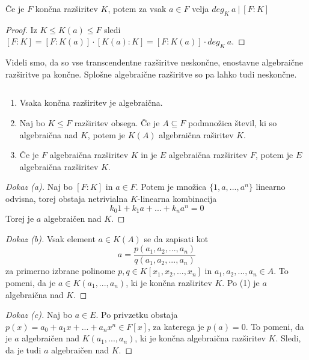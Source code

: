 \documentclass[11pt, a4paper]{article}
\begin{document}
    \begin{corollary}
        Če je \(F\) končna razširitev \(K\), potem za vsak \(a \in F\) velja \(deg_{K}\ a\ |\ [F:K]\)
    \end{corollary}

    \begin{proof}
        Iz \(K \le K(a) \le F\) sledi \([F:K] = [F:K(a)] \cdot [K(a):K] = [F:K(a)] \cdot deg_{K}\ a\).
    \end{proof}


    Videli smo, da so vse transcendentne razširitve neskončne, enostavne algebraične razširitve pa končne. Splošne algebraične razširitve so pa lahko tudi neskončne.

    \begin{theorem}
        \(\)\par
        \begin{enumerate}[label=\alph*)]
            \item Vsaka končna razširitev je algebraična.
            \item Naj bo \(K \le F\) razširitev obsega. Če je \(A \subseteq F\) podmnožica števil, ki so algebraična nad \(K\), potem je \(K(A)\) algebraična raširitev \(K\).
            \item Če je \(F\) algebraična razširitev \(K\) in je \(E\) algebraična razširitev \(F\), potem je \(E\) algebraična razširitev \(K\).
        \end{enumerate}
    \end{theorem}

    \begin{proof}[Dokaz \emph{(a)}]
        Naj bo \([F:K]\) in \(a \in F\). Potem je množica \(\{1,a,...,a^{n}\}\) linearno odvisna, torej obstaja netrivialna \(K\)-linearna kombinacija 
        \[k_0 1 + k_1 a + ... + k_n a^{n} = 0\]
        Torej je \(a\) algebraičen nad \(K\).
    \end{proof}

    \begin{proof}[Dokaz \emph{(b)}]
        Vsak element \(a \in K(A)\) se da zapisati kot 
        \[a = \frac{p(a_1,a_2,...,a_n)}{q(a_1,a_2,...,a_n)}\]
        za primerno izbrane polinome \(p,q \in K[x_1,x_2,...,x_n]\) in \(a_1,a_2,...,a_n \in A\). To pomeni, da je \(a \in K(a_1,...,a_n)\), ki je končna razširitev \(K\). Po (1) je \(a\) algebraična nad \(K\).
    \end{proof}

    \begin{proof}[Dokaz \emph{(c)}]
        Naj bo \(a \in E\). Po privzetku obstaja \(p(x)=a_0 + a_1 x + ... + a_n x^n \in F[x]\), za katerega je \(p(a) = 0\). To pomeni, da je \(a\) algebraičen nad \(K(a_1,...,a_n)\), ki je končna algebraična razširitev \(K\). Sledi, da je tudi \(a\) algebraičen nad \(K\).
    \end{proof}
\end{document}
